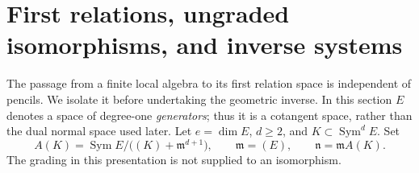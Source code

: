 \documentclass[11pt,reqno]{amsart}
\numberwithin{equation}{section}
\theoremstyle{definition}\newtheorem{definition}[theorem]{Definition}
\theoremstyle{remark}\newtheorem{remark}[theorem]{Remark}
\DeclareMathOperator{\Sym}{Sym}\DeclareMathOperator{\Gr}{Gr}
\begin{document}
\section{First relations, ungraded isomorphisms, and inverse systems}
\label{sec:first-relations-v147}

The passage from a finite local algebra to its first relation space is
independent of pencils.  We isolate it before undertaking the geometric
inverse.  In this section \(E\) denotes a space of degree-one
\emph{generators}; thus it is a cotangent space, rather than the dual
normal space used later.  Let \(e=\dim E\), \(d\ge2\), and
\(K\subset\Sym^d E\).  Set
\begin{equation}\label{eq:general-first-algebra-v147}
 A(K)=\Sym E/\bigl((K)+\mathfrak m^{d+1}\bigr),
 \qquad \mathfrak m=(E),\qquad \mathfrak n=\mathfrak m A(K).
\end{equation}
The grading in this presentation is not supplied to an isomorphism.
\end{document}
